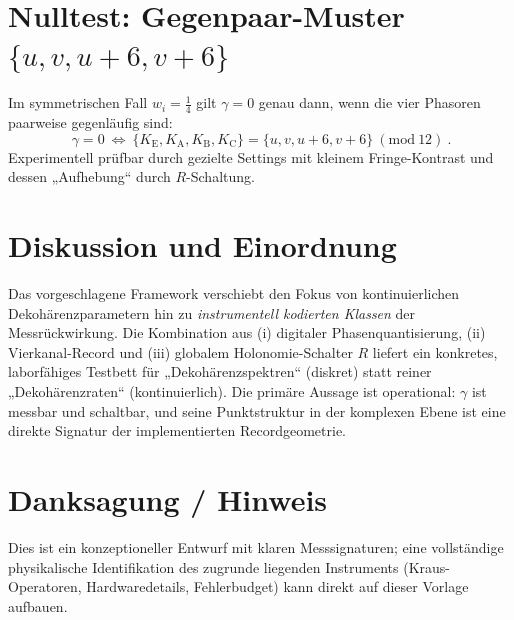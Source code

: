 \documentclass[11pt,a4paper]{article}
\newcommand{\modtwelve}{\ (\mathrm{mod}\ 12)}
\newcommand{\EE}{\mathrm{E}}
\newcommand{\AA}{\mathrm{A}}
\newcommand{\BB}{\mathrm{B}}
\newcommand{\CC}{\mathrm{C}}
\begin{document}
	\section{Nulltest: Gegenpaar-Muster $\{u,v,u{+}6,v{+}6\}$}
	
	Im symmetrischen Fall \(w_i=\tfrac14\) gilt \(\gamma=0\) genau dann, wenn die vier Phasoren paarweise
	gegenläufig sind:
	\begin{equation}
		\boxed{\ \gamma=0\ \Longleftrightarrow\ \{K_\EE,K_\AA,K_\BB,K_\CC\}=\{u,v,u+6,v+6\}\modtwelve\ }.
	\end{equation}
	Experimentell prüfbar durch gezielte Settings mit kleinem Fringe-Kontrast und dessen „Aufhebung“ durch \(R\)-Schaltung.
	
	\section{Diskussion und Einordnung}
	
	Das vorgeschlagene Framework verschiebt den Fokus von kontinuierlichen Dekohärenzparametern hin zu
	\emph{instrumentell kodierten Klassen} der Messrückwirkung. Die Kombination aus (i) digitaler
	Phasenquantisierung, (ii) Vierkanal-Record und (iii) globalem Holonomie-Schalter \(R\) liefert ein
	konkretes, laborfähiges Testbett für „Dekohärenzspektren“ (diskret) statt reiner „Dekohärenzraten“ (kontinuierlich).
	Die primäre Aussage ist operational: \(\gamma\) ist messbar und schaltbar, und seine Punktstruktur in der
	komplexen Ebene ist eine direkte Signatur der implementierten Recordgeometrie.
	
	\section*{Danksagung / Hinweis}
	Dies ist ein konzeptioneller Entwurf mit klaren Messsignaturen; eine vollständige physikalische Identifikation
	des zugrunde liegenden Instruments (Kraus-Operatoren, Hardwaredetails, Fehlerbudget) kann direkt auf
	dieser Vorlage aufbauen.
	
\end{document}
